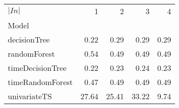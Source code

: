 \begin{tabular}{lrrrr}
\toprule
$|In|$ & 1 & 2 & 3 & 4 \\
Model &  &  &  &  \\
\midrule
decisionTree & 0.22 & 0.29 & 0.29 & 0.29 \\
randomForest & 0.54 & 0.49 & 0.49 & 0.49 \\
timeDecisionTree & 0.22 & 0.23 & 0.24 & 0.23 \\
timeRandomForest & 0.47 & 0.49 & 0.49 & 0.49 \\
univariateTS & 27.64 & 25.41 & 33.22 & 9.74 \\
\bottomrule
\end{tabular}
